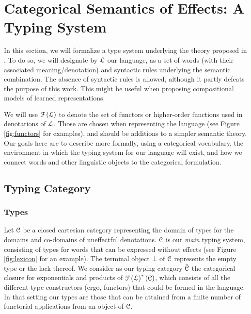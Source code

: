 \section{Categorical Semantics of Effects: A Typing System}
In this section, we will formalize a type system underlying the theory proposed
in \cite{bumfordEffectdrivenInterpretationFunctors2025}.
To do so, we will designate by $\mathcal{L}$ our language, as a set of words
(with their associated meaning/denotation) and syntactic rules underlying
the semantic combination.
The absence of syntactic rules is allowed, although it partly defeats the
purpose of this work.
This might be useful when proposing compositional models of learned
representations.

We will use $\mathcal{F}\left( \mathcal{L} \right)$ to denote the set of functors or
higher-order functions used in denotations of $\mathcal{L}$.
Those are chosen when representing the language (see Figure \ref{fig:functors}
for examples), and should be additions to a simpler semantic theory.
Our goals here are to describe more formally, using a categorical vocabulary,
the environment in which the typing system for our language will exist, and how
we connect words and other linguistic objects to the categorical formulation.

\subsection{Typing Category}
\subsubsection{Types}
Let $\mathcal{C}$ be a closed cartesian category representing the
domain of types for the domains and co-domains of uneffectful denotations.
$\mathcal{C}$ is our \emph{main} typing system, consisting of types for words
that can be expressed without effects (see Figure \ref{fig:lexicon} for an
example).
The terminal object $\bot$ of $\mathcal{C}$ represents the empty type or the lack
thereof.
We consider as our typing category $\bar{\mathcal{C}}$ the categorical closure for
exponentials and products of $\mathcal{F}\left( \mathcal{L} \right)^{*}\left(\mathcal{C}\right)$,
which consists of all the different type constructors (ergo, functors) that
could be formed in the language.
In that setting our types are those that can be attained from a finite number
of functorial applications from an object of $\mathcal{C}$.

